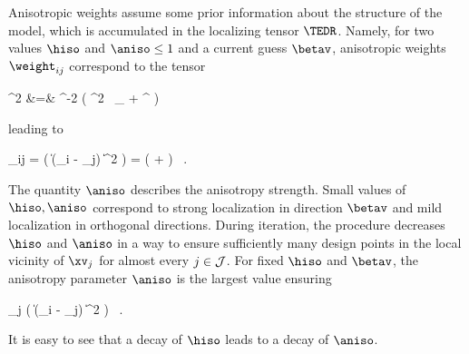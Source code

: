 Anisotropic weights assume some prior information about the structure of the model, which is accumulated 
in the localizing tensor \( \TEDR \).
Namely, for two values \( \hiso \) and \( \aniso \leq 1 \) and a current guess \( \betav \), anisotropic weights \( \weight_{ij} \)
correspond to the tensor 
\begin{EQA}[rcl]
	\TEDR^{2}
	&=&
	\hiso^{-2} \bigl( \aniso^{2} \, \Id_{\dimd} + \betav \betav^{\T} \bigr)
\label{iufhvu8kjbmnll475edf}
\end{EQA}
leading to 
\begin{EQA}[c]
	\weight_{ij}
	=
	\Kern\bigl( \| \TEDR (\Xv_{i} - \xv_{j}) \|^{2} \bigr)
	=
	\Kern\bigl( 
		+  
	\bigr)
	\, .
\end{EQA}
The quantity \( \aniso \) describes the anisotropy strength.
Small values of \( \hiso, \aniso \) correspond to strong localization in direction \( \betav \)
and mild localization in orthogonal directions. 
During iteration, the procedure decreases \( \hiso \) and \( \aniso \) in a way 
to ensure sufficiently many design points in the local vicinity of \( \xv_{j} \) 
for almost every \( j \in \mathcal{J} \).
For fixed \( \hiso \) and \( \betav \), the anisotropy parameter \( \aniso \) is the largest value ensuring
\begin{EQA}[c]
	 \sum_{j \in \JJJ} 
	\sumi \Kern\bigl( \| \TEDR (\Xv_{i} - \xv_{j}) \|^{2} \bigr)
	\geq 
	\nmin
	\, .
	\qquad
\label{jhgiverkytde4w34etycja}
\end{EQA}
It is easy to see that a decay of \( \hiso \) leads to a decay of \( \aniso \).

